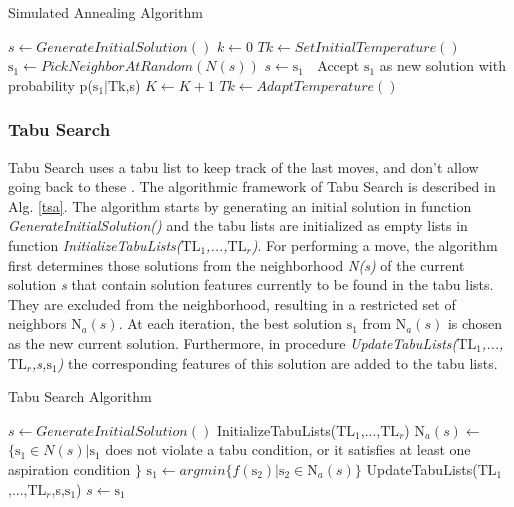 \documentclass[espaco=umemeio,chapter=TITLE,twoside,openright]{abnt}
\begin{document}
\begin{algorithm}[t]
  \caption{Simulated Annealing Algorithm}\label{sa}
  \begin{algorithmic}[1]

    \State $s\gets GenerateInitialSolution()$
    \State $k\gets 0 $
    \State $Tk\gets SetInitialTemperature()$
    \State $\mbox{s}_1\gets PickNeighborAtRandom(N (s))$
    \State $s\gets\mbox{s}_1$
    \Else $\;$ Accept $\mbox{s}_1$ as new solution with probability p($\mbox{s}_1|$Tk,s)
    \EndIf
    \State $K\gets K+1$
    \State $Tk\gets AdaptTemperature()$
    \EndWhile

  \end{algorithmic}
\end{algorithm}

\subsubsection{Tabu Search}

Tabu Search uses a tabu list to keep track of the last  moves, and don’t allow going back to these \cite{Glover1986}. The algorithmic framework of Tabu Search is described in Alg. \ref{tsa}.  The algorithm starts by generating an initial solution in function \textit{GenerateInitialSolution()} and the tabu lists are initialized as empty lists in function \textit{InitializeTabuLists($\mbox{TL}_1$,...,$\mbox{TL}_r$)}. For performing a move, the algorithm first determines those solutions from the neighborhood \textit{N(s)} of the current solution \textit{s} that contain solution features currently to be found in the tabu lists. They are excluded from the neighborhood, resulting in a restricted set of neighbors \textit{$\mbox{N}_a(s)$}. At each iteration, the best solution \textit{$\mbox{s}_1$} from \textit{$\mbox{N}_a(s)$} is chosen as the new current solution. Furthermore, in procedure \textit{UpdateTabuLists($\mbox{TL}_1$,...,$\mbox{TL}_r$,s,$\mbox{s}_1$)} the corresponding features of this solution are added to the tabu lists.


\begin{algorithm}[t]
  \caption{Tabu Search Algorithm}\label{tsa}
  \begin{algorithmic}[2]

    \State $s\gets GenerateInitialSolution()$
    \State InitializeTabuLists($\mbox{TL}_1$,...,$\mbox{TL}_r$)
    \State $\mbox{N}_a(s)\gets$ $\{\mbox{s}_1 \in N(s) |\mbox{s}_1$ does not violate a tabu condition, or it satisfies at least one aspiration condition $\}$
    \State $\mbox{s}_1\gets argmin\{f(\mbox{s}_2)|\mbox{s}_2 \in \mbox{N}_a(s) \}$
    \State UpdateTabuLists($\mbox{TL}_1$,...,$\mbox{TL}_r$,s,$\mbox{s}_1$)
    \State $s\gets \mbox{s}_1$
    \EndWhile

  \end{algorithmic}
\end{algorithm}
\end{document}
